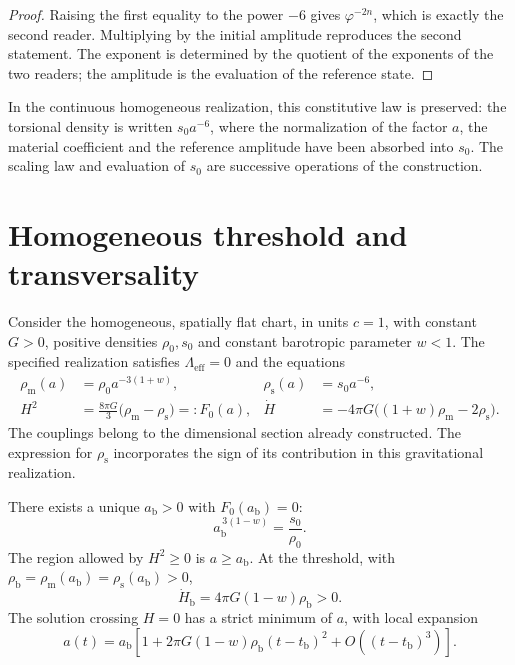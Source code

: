 \begin{proof}
Raising the first equality to the power \(-6\) gives
\(\varphi^{-2n}\), which is exactly the second reader. Multiplying
by the initial amplitude reproduces the second statement. The exponent
is determined by the quotient of the exponents of the two
readers; the amplitude is the evaluation of the reference state.
\end{proof}

In the continuous homogeneous realization, this constitutive law is preserved:
the torsional density is written \(s_0a^{-6}\), where the normalization
of the factor \(a\), the material coefficient and the reference amplitude
have been absorbed into \(s_0\). The scaling law and evaluation of
\(s_0\) are successive operations of the construction.

\section{Homogeneous threshold and transversality}
\label{x_reciprocidad:vii:sec:umbral-rebote}

Consider the homogeneous, spatially flat chart, in units \(c=1\),
with constant \(G>0\), positive densities \(\rho_0,s_0\) and constant
barotropic parameter \(w<1\). The specified realization satisfies
\(\Lambda_{\mathrm{eff}}=0\) and the equations
\begin{align}
 \rho_{\mathrm m}(a)&=\rho_0a^{-3(1+w)},&
 \rho_{\mathrm s}(a)&=s_0a^{-6},\\
 H^2&=\frac{8\pi G}{3}
        \bigl(\rho_{\mathrm m}-\rho_{\mathrm s}\bigr)
        =:F_0(a),&
 \dot H&=-4\pi G
        \bigl((1+w)\rho_{\mathrm m}-2\rho_{\mathrm s}\bigr).
 \label{x_reciprocidad:vii:eq:dinamica-homogenea}
\end{align}
The couplings belong to the dimensional section already constructed.
The expression for \(\rho_{\mathrm s}\) incorporates the sign of its
contribution in this gravitational realization.

\begin{theorem}
\label{x_reciprocidad:vii:thm:rebote}
There exists a unique \(a_{\mathrm b}>0\) with \(F_0(a_{\mathrm b})=0\):
\[
 a_{\mathrm b}^{\,3(1-w)}=\frac{s_0}{\rho_0}.
\]
The region allowed by \(H^2\geq0\) is \(a\geq a_{\mathrm b}\).
At the threshold, with
\(\rho_{\mathrm b}=\rho_{\mathrm m}(a_{\mathrm b})
                  =\rho_{\mathrm s}(a_{\mathrm b})>0\),
\[
 \dot H_{\mathrm b}=4\pi G(1-w)\rho_{\mathrm b}>0.
\]
The solution crossing \(H=0\) has a strict minimum of \(a\),
with local expansion
\[
 a(t)=a_{\mathrm b}\left[
 1+2\pi G(1-w)\rho_{\mathrm b}(t-t_{\mathrm b})^2
 +O((t-t_{\mathrm b})^3)\right].
\]
\end{theorem}

